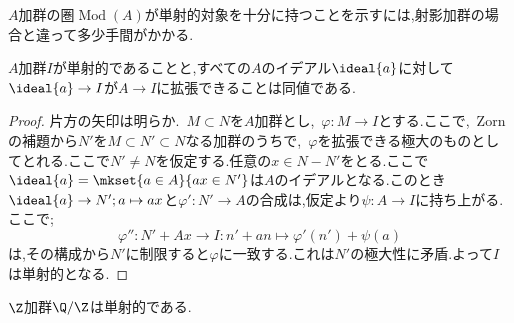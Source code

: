 $A$加群の圏$\operatorname{Mod}(A)$が単射的対象を十分に持つことを示すには,射影加群の場合と違って多少手間がかかる.

\begin{prop}
	$A$加群$I$が単射的であることと,すべての$A$のイデアル$\ideal{a}$に対して$\ideal{a}\to I$が$A\to I$に拡張できることは同値である.
\end{prop}

\begin{proof}
	片方の矢印は明らか.~$M\subset N$を$A$加群とし,~$\varphi:M\to I$とする.ここで,~Zornの補題から$N'$を$M\subset N'\subset N$なる加群のうちで,~$\varphi$を拡張できる極大のものとしてとれる.ここで$N'\neq N$を仮定する.任意の$x\in N-N'$をとる.ここで$\ideal{a}=\mkset{a\in A}{ax\in N'}$は$A$のイデアルとなる.このとき$\ideal{a}\to N';a\mapsto ax$と$\varphi':N'\to A$の合成は,仮定より$\psi:A\to I$に持ち上がる.ここで;
	\[\varphi'':N'+Ax\to I:n'+an\mapsto \varphi'(n')+\psi(a)\]
	は,その構成から$N'$に制限すると$\varphi$に一致する.これは$N'$の極大性に矛盾.よって$I$は単射的となる. 
\end{proof}

\begin{cor}
	$\Z$加群$\Q/\Z$は単射的である.
\end{cor}

